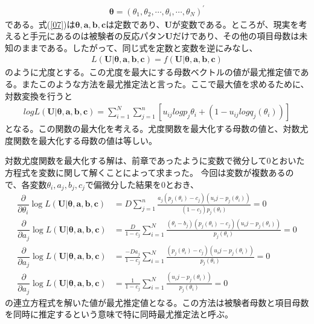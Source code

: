 \documentclass[12pt]{jarticle}
\begin{document}
\begin{align}
  \label{08}
  \displaystyle \boldsymbol{\theta} = (\theta_1,\theta_2,\cdots,\theta_i,\cdots,\theta_N)^{\prime} \tag{4.8}
\end{align}
である。式(\ref{07})は$\boldsymbol{\theta},\boldsymbol{a},\boldsymbol{b},\boldsymbol{c}$は定数であり、$\boldsymbol{U}$が変数である。ところが、現実を考えると手元にあるのは被験者の反応パタン$\boldsymbol{U}$だけであり、その他の項目母数は未知のままである。したがって、同じ式を定数と変数を逆にみなし、
\begin{align}
  \label{09}
  \displaystyle L(\boldsymbol{U}|\boldsymbol{\theta},\boldsymbol{a},\boldsymbol{b},\boldsymbol{c}) = f(\boldsymbol{U}|\boldsymbol{\theta},\boldsymbol{a},\boldsymbol{b},\boldsymbol{c}) \tag{4.9}
\end{align}
のように尤度とする。この尤度を最大にする母数ベクトルの値が最尤推定値である。またこのような方法を最尤推定法と言った。ここで最大値を求めるために、対数変換を行うと
\begin{align}
  \label{10}
  \displaystyle log L(\boldsymbol{U}|\boldsymbol{\theta},\boldsymbol{a},\boldsymbol{b},\boldsymbol{c}) = \sum_{i = 1}^{N} \sum_{j = 1}^{n} [u_{ij} log p_j{\theta_i} + (1 - u_{ij} log q_j(\theta_i))]     \tag{4.10}
\end{align}
となる。この関数の最大化を考える。尤度関数を最大化する母数の値と、対数尤度関数を最大化する母数の値は等しい。

対数尤度関数を最大化する解は、前章であったように変数で微分して$0$とおいた方程式を変数に関して解くことによって求まった。
今回は変数が複数あるので、各変数$\theta_i,a_j,b_j,c_j$で偏微分した結果を$0$とおき、
\begin{align}
  \label{11}
  \displaystyle \dfrac{\partial }{\partial \theta_i} \log L(\boldsymbol{U}|\boldsymbol{\theta},\boldsymbol{a},\boldsymbol{b},\boldsymbol{c}) &= D\sum_{j = 1}^{n} \frac{a_j(p_j(\theta_i) - c_j)(u_ij - p_j(\theta_i))}{(1 - c_j)p_j(\theta_i)}=0    \tag{4.11} \\
  \displaystyle \dfrac{\partial }{\partial a_j} \log L(\boldsymbol{U}|\boldsymbol{\theta},\boldsymbol{a},\boldsymbol{b},\boldsymbol{c}) &= \frac{D}{1 - c_j}\sum_{i = 1}^{N} \frac{(\theta_i - b_j)(p_j(\theta_i) - c_j)(u_ij - p_j(\theta_i))}{p_j(\theta_i)}=0    \tag{4.12}\\
  \displaystyle \dfrac{\partial }{\partial a_j} \log L(\boldsymbol{U}|\boldsymbol{\theta},\boldsymbol{a},\boldsymbol{b},\boldsymbol{c}) &= \frac{-Da_j}{1 - c_j}\sum_{i = 1}^{N} \frac{(p_j(\theta_i) - c_j)(u_ij - p_j(\theta_i))}{p_j(\theta_i)}=0    \tag{4.13} \\
  \displaystyle \dfrac{\partial }{\partial a_j} \log L(\boldsymbol{U}|\boldsymbol{\theta},\boldsymbol{a},\boldsymbol{b},\boldsymbol{c}) &= \frac{1}{1 - c_j}\sum_{i = 1}^{N} \frac{(u_ij - p_j(\theta_i))}{p_j(\theta_i)}=0    \tag{4.13}
\end{align}
の連立方程式を解いた値が最尤推定値となる。この方法は被験者母数と項目母数を同時に推定するという意味で特に同時最尤推定法と呼ぶ。
\end{document}
